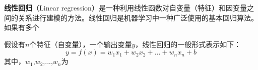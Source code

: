 
\textbf{线性回归}（Linear regression）是一种利用线性函数对自变量（特征）和因变量之间的关系进行建模的方法。线性回归是机器学习中一种广泛使用的基本回归算法。如果有多个

假设有$n$个特征（自变量），一个输出变量$y$，线性回归的一般形式表示如下：
\begin{equation}
y=f(x)=w_1x_1+w_2x_2+...+w_nx_n+b
\end{equation}
其中，$w_1$,$w_2$,...,$w_n$为